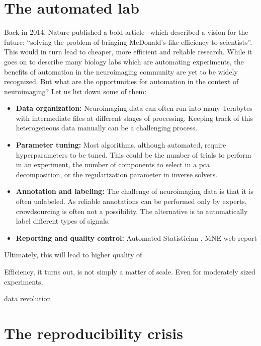 \section{The automated lab}
Back in 2014, Nature published a bold article~\citep{hayden2014automated} which described a vision for the future: ``solving the problem of bringing McDonald's-like efficiency to scientists''. This would in turn lead to cheaper, more efficient and reliable research. While it goes on to describe many biology labs which are automating experiments, the benefits of automation in the neuroimaging community are yet to be widely recognized. But what are the opportunities for automation in the context of neuroimaging? Let us list down some of them:
\begin{itemize}[noitemsep,nolistsep,nosep]
\item \textbf{Data organization:} Neuroimaging data can often run into many Terabytes with intermediate files at different stages of processing. Keeping track of this heterogeneous data manually can be a challenging process.
\item \textbf{Parameter tuning:} Most algorithms, although automated, require hyperparameters to be tuned. This could be the number of trials to perform in an experiment, the number of components to select in a \ac{pca} decomposition, or the regularization parameter in inverse solvers.
\item \textbf{Annotation and labeling:} The challenge of neuroimaging data is that it is often unlabeled. As reliable annotations can be performed only by experts, crowdsourcing is often not a possibility. The alternative is to automatically label different types of signals.
\item \textbf{Reporting and quality control:} Automated Statistician . \ac{MNE} web report
\end{itemize}
Ultimately, this will lead to higher quality of 

Efficiency, it turns out, is not simply a matter of scale. Even for moderately sized experiments,

%

data revolution

\section{The reproducibility crisis}

